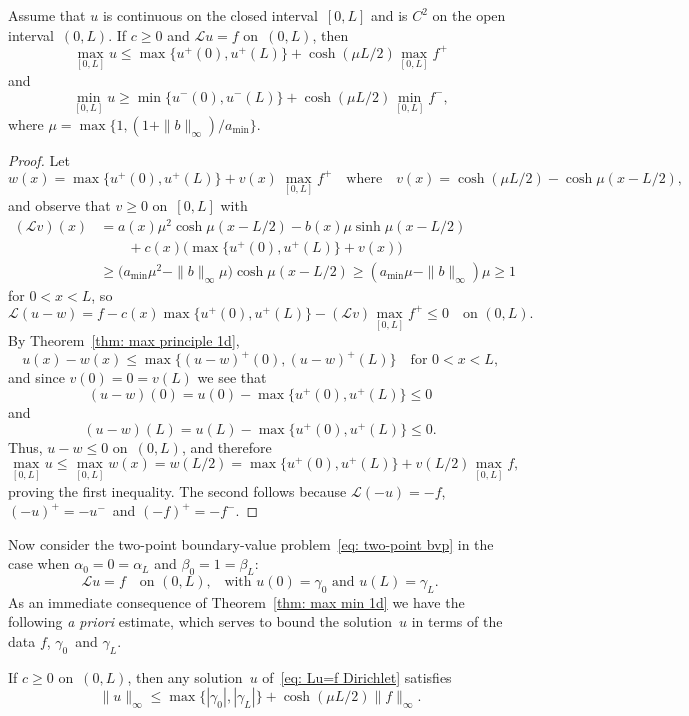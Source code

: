 \begin{theorem}\label{thm: max min 1d}
Assume that $u$ is continuous on the closed interval~$[0,L]$ and is $C^2$ on 
the open interval~$(0,L)$. If $c\ge0$ and $\mathcal{L}u=f$ on~$(0,L)$, then
\[
\max_{[0,L]}u\le\max\{u^+(0),u^+(L)\}+\cosh(\mu L/2)\max_{[0,L]}f^+
\]
and
\[
\min_{[0,L]}u\ge\min\{u^-(0),u^-(L)\}+\cosh(\mu L/2)\min_{[0,L]}f^-,
\]
where $\mu=\max\bigl\{1,(1+\|b\|_\infty)/a_{\min}\bigr\}$.
\end{theorem}
\begin{proof}
Let
\[
w(x)=\max\{u^+(0),u^+(L)\}+v(x)\,\max_{[0,L]}f^+
\quad\text{where}\quad
v(x)=\cosh(\mu L/2)-\cosh\mu(x-L/2),
\]
and observe that $v\ge0$ on~$[0,L]$ with
\begin{align*}
(\mathcal{L}v)(x)&=a(x)\mu^2\cosh\mu(x-L/2)
	-b(x)\mu\sinh\mu(x-L/2)\\
	&\qquad{}+c(x)\bigl(\max\{u^+(0),u^+(L)\}+v(x)\big)\\
	&\ge\bigl(a_{\min}\mu^2-\|b\|_\infty\mu\bigr)\cosh\mu(x-L/2)
	\ge(a_{\min}\mu-\|b\|_\infty)\mu\ge1
\end{align*}
for $0<x<L$, so
\[
\mathcal{L}(u-w)=f-c(x)\max\{u^+(0),u^+(L)\}-(\mathcal{L}v)\max_{[0,L]}f^+
	\le0\quad\text{on $(0,L)$.}
\]
By Theorem~\ref{thm: max principle 1d},
\[
u(x)-w(x)\le\max\{(u-w)^+(0),(u-w)^+(L)\}\quad\text{for $0<x<L$,}
\]
and since $v(0)=0=v(L)$ we see that 
\[
(u-w)(0)=u(0)-\max\{u^+(0),u^+(L)\}\le0
\]
and
\[
(u-w)(L)=u(L)-\max\{u^+(0),u^+(L)\}\le0.
\]
Thus, $u-w\le0$ on~$(0,L)$, and therefore 
\[
\max_{[0,L]}u\le\max_{[0,L]}w(x)=w(L/2)=\max\{u^+(0),u^+(L)\}
	+v(L/2)\max_{[0,L]}f, 
\]
proving the first inequality.  
The second follows because $\mathcal{L}(-u)=-f$, $(-u)^+=-u^-$~and
$(-f)^+=-f^-$.
\end{proof}

Now consider the two-point boundary-value problem~\eqref{eq: two-point bvp} in 
the case when $\alpha_0=0=\alpha_L$ and $\beta_0=1=\beta_L$:
\begin{equation}\label{eq: Lu=f Dirichlet}
\mathcal{L}u=f\quad\text{on $(0,L)$,}
	\quad\text{with $u(0)=\gamma_0$ and $u(L)=\gamma_L$.}
\end{equation}
As an immediate consequence of Theorem~\ref{thm: max min 1d} we have the 
following \emph{a priori} estimate, which serves to bound the solution~$u$ in 
terms of the data $f$, $\gamma_0$~and $\gamma_L$.

\begin{theorem}\label{thm: Lu=f apriori infty}
If $c\ge0$ on~$(0,L)$, then any solution~$u$ of~\eqref{eq: Lu=f Dirichlet} 
satisfies
\[
\|u\|_\infty\le\max\{|\gamma_0|,|\gamma_L|\}+\cosh(\mu L/2)\|f\|_\infty.
\]
\end{theorem}

